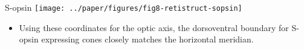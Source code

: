 \documentclass[final]{beamer}
\begin{document}
\begin{frame}{}
\begin{columns}[T]
\begin{column}{.37\linewidth}
      \begin{block}{S-opsin}
        \texttt{[image: ../paper/figures/fig8-retistruct-sopsin]}     

        \begin{itemize}
        \item Using these coordinates for the optic axis, the
          dorsoventral boundary for S-opsin expressing cones closely
          matches the horizontal meridian.
        \end{itemize}
      \end{block}



    \end{column}


  \end{columns}



\end{frame}
\end{document}
